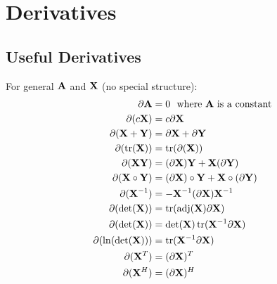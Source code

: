 \chapter{Derivatives}

\section{Useful Derivatives}
For general $\mathbf{A}$ and $\mathbf{X}$ (no special structure):
\begin{align}
\partial\mathbf{A}           &= 0~~\textrm{where $\mathbf{A}$ is a constant} \\
\partial(c\mathbf{X})        &= c\partial\mathbf{X}                          \\
\partial(\mathbf{X}+\mathbf{Y})     &= \partial\mathbf{X}+\partial\mathbf{Y}               \\
\partial(\operatorname{tr}(\mathbf{X})) &= \operatorname{tr}(\partial(\mathbf{X}))                 \\
\partial(\mathbf{X}\mathbf{Y})      &= (\partial\mathbf{X})\mathbf{Y} + \mathbf{X}(\partial\mathbf{Y})   \\
\partial(\mathbf{X}\circ\mathbf{Y}) &= (\partial\mathbf{X})\circ\mathbf{Y} + \mathbf{X}\circ(\partial\mathbf{Y}) \\
\partial(\mathbf{X}^{-1})    &= -\mathbf{X}^{-1}(\partial\mathbf{X})\mathbf{X}^{-1}        \\
\partial(\det(\mathbf{X}))   &= \operatorname{tr}(\textrm{adj}(\mathbf{X})\partial\mathbf{X})  \\
\partial(\det(\mathbf{X}))   &= \det(\mathbf{X})\operatorname{tr}(\mathbf{X}^{-1}\partial\mathbf{X})  \\
\partial(\ln(\det(\mathbf{X}))) &= \operatorname{tr}(\mathbf{X}^{-1}\partial\mathbf{X})        \\
\partial(\mathbf{X}^T)       &= (\partial\mathbf{X})^T                       \\
\partial(\mathbf{X}^H)       &= (\partial\mathbf{X})^H                       
\end{align}